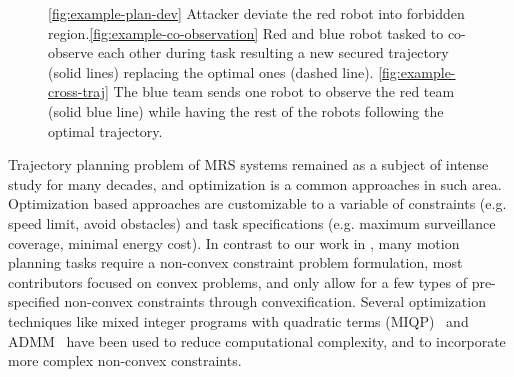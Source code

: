 \documentclass[10pt,twocolumn,twoside]{IEEEtran}
\newcommand{\news}{\color{blue}}
\begin{document}
\begin{figure}
	\centering
    
    \caption{{\news \ref{fig:example-plan-dev} Attacker deviate the red robot into forbidden region.\ref{fig:example-co-observation} Red and blue robot tasked to co-observe each other during task resulting a new secured trajectory (solid lines) replacing the optimal ones (dashed line). \ref{fig:example-cross-traj} The blue team sends one robot to observe the red team (solid blue line) while having the rest of the robots following the optimal trajectory.}\label{fig:cross-traj-comparison-set}}
\end{figure}

\noindent{} Trajectory planning problem of MRS systems remained as a subject of intense study for many decades, and optimization is a common approaches in such area. Optimization based approaches are customizable to a variable of constraints (e.g. speed limit, avoid obstacles) and task specifications (e.g. maximum surveillance coverage, minimal energy cost). In contrast to our work in , many motion planning tasks require a non-convex constraint problem formulation, most contributors focused on convex problems, and only allow for a few types of pre-specified non-convex constraints through convexification\cite{liu2014solving}\cite{VanParys2016}\cite{Schulman2014}. Several optimization techniques like mixed integer programs with quadratic terms (MIQP)~\cite{mellinger2012mixed} and ADMM~\cite{bento2013message} have been used to reduce computational complexity, and to incorporate more complex non-convex constraints.
\end{document}
